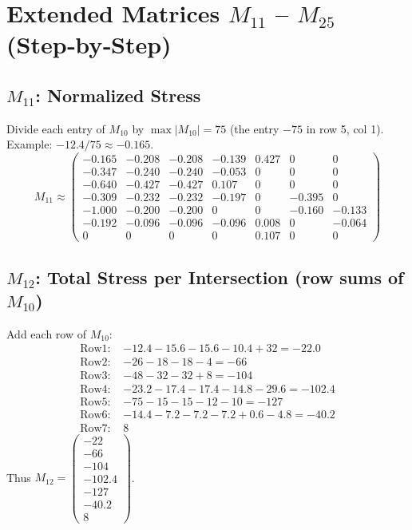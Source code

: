 \documentclass{ximera}
\begin{document}
\newpage

\section*{Extended Matrices \texorpdfstring{\(M_{11}\)}{M11} – \texorpdfstring{\(M_{25}\)}{M25} (Step‑by‑Step)}

\subsection*{\texorpdfstring{\(M_{11}\)}{M11}: Normalized Stress}
Divide each entry of \(M_{10}\) by \(\max|M_{10}| = 75\) (the entry \(-75\) in row 5, col 1).  
Example: \(-12.4/75 \approx -0.165\).  
\[
M_{11} \approx \begin{pmatrix}
-0.165 & -0.208 & -0.208 & -0.139 & 0.427 & 0 & 0\\
-0.347 & -0.240 & -0.240 & -0.053 & 0 & 0 & 0\\
-0.640 & -0.427 & -0.427 & 0.107 & 0 & 0 & 0\\
-0.309 & -0.232 & -0.232 & -0.197 & 0 & -0.395 & 0\\
-1.000 & -0.200 & -0.200 & 0 & 0 & -0.160 & -0.133\\
-0.192 & -0.096 & -0.096 & -0.096 & 0.008 & 0 & -0.064\\
0 & 0 & 0 & 0 & 0.107 & 0 & 0
\end{pmatrix}
\]

\subsection*{\texorpdfstring{\(M_{12}\)}{M12}: Total Stress per Intersection (row sums of \(M_{10}\))}
Add each row of \(M_{10}\):
\[
\begin{aligned}
\text{Row1: } &-12.4-15.6-15.6-10.4+32 = -22.0\\
\text{Row2: } &-26-18-18-4 = -66\\
\text{Row3: } &-48-32-32+8 = -104\\
\text{Row4: } &-23.2-17.4-17.4-14.8-29.6 = -102.4\\
\text{Row5: } &-75-15-15-12-10 = -127\\
\text{Row6: } &-14.4-7.2-7.2-7.2+0.6-4.8 = -40.2\\
\text{Row7: } &8
\end{aligned}
\]
Thus \(M_{12} = \begin{pmatrix} -22 \\ -66 \\ -104 \\ -102.4 \\ -127 \\ -40.2 \\ 8 \end{pmatrix}\).
\end{document}
